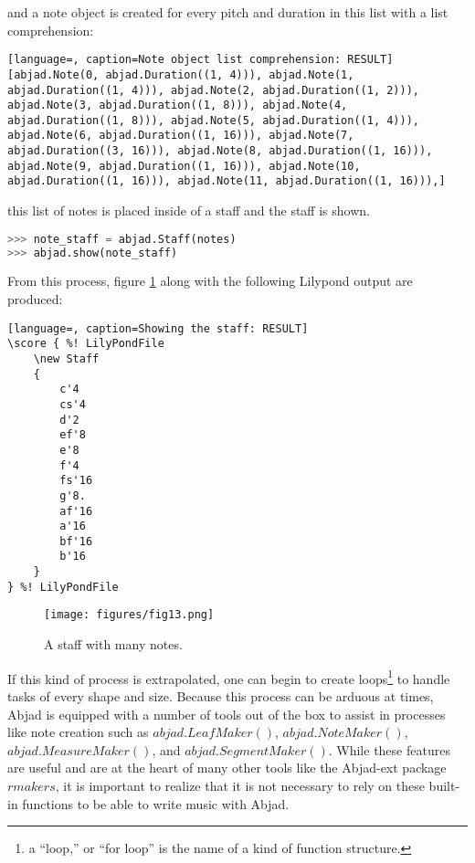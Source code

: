 and a note object is created for every pitch and duration in this list with a list comprehension:

\singlespace
\begin{lstlisting}[language=, caption=Note object list comprehension: RESULT]
[abjad.Note(0, abjad.Duration((1, 4))), abjad.Note(1, abjad.Duration((1, 4))), abjad.Note(2, abjad.Duration((1, 2))), abjad.Note(3, abjad.Duration((1, 8))), abjad.Note(4, abjad.Duration((1, 8))), abjad.Note(5, abjad.Duration((1, 4))), abjad.Note(6, abjad.Duration((1, 16))), abjad.Note(7, abjad.Duration((3, 16))), abjad.Note(8, abjad.Duration((1, 16))), abjad.Note(9, abjad.Duration((1, 16))), abjad.Note(10, abjad.Duration((1, 16))), abjad.Note(11, abjad.Duration((1, 16))),]
\end{lstlisting}
\doublespace

this list of notes is placed inside of a staff and the staff is shown.

\singlespace
\begin{lstlisting}[language=Python, caption=Showing the staff]
>>> note_staff = abjad.Staff(notes)
>>> abjad.show(note_staff)
\end{lstlisting}
\doublespace

From this process, figure \ref{fig:staff_with_more_pitches} along with the following Lilypond output are produced:

\singlespace
\begin{lstlisting}[language=, caption=Showing the staff: RESULT]
\score { %! LilyPondFile
    \new Staff
    {
        c'4
        cs'4
        d'2
        ef'8
        e'8
        f'4
        fs'16
        g'8.
        af'16
        a'16
        bf'16
        b'16
    }
} %! LilyPondFile
\end{lstlisting}
\doublespace

\singlespace
\begin{figure}[h]
  \texttt{[image: figures/fig13.png]}
  \caption{A staff with many notes.}
  \label{fig:staff_with_more_pitches}
\end{figure}
\doublespace

If this kind of process is extrapolated, one can begin to create loops\footnote{a ``loop,'' or ``for loop'' is the name of a kind of function structure.} to handle tasks of every shape and size. Because this process can be arduous at times, Abjad is equipped with a number of tools out of the box to assist in processes like note creation such as $abjad.LeafMaker()$, $abjad.NoteMaker()$, $abjad.MeasureMaker()$, and $abjad.SegmentMaker()$. While these features are useful and are at the heart of many other tools like the Abjad-ext package $rmakers$, it is important to realize that it is not necessary to rely on these built-in functions to be able to write music with Abjad. 

